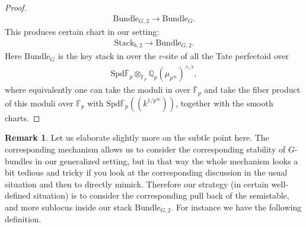 \documentclass[12pt]{book}
\theoremstyle{definition}
\newtheorem{remark}{Remark}
\begin{document}
\begin{proof}
\begin{align}
\mathrm{Bundle}_{G,2} \rightarrow \mathrm{Bundle}_{G}.
\end{align}
This produces certain chart in our setting:
\begin{align}
\mathrm{Stack}_{b,2}\rightarrow \mathrm{Bundle}_{G,2}.
\end{align}
Here $\mathrm{Bundle}_G$ is the key stack in \cite{FS} over the $v$-site of all the Tate perfectoid over
\begin{align}
\mathrm{Spd}\overline{\mathbb{F}}_p\otimes_{\mathbb{F}_p}\mathbb{Q}_p(\mu_{p^\infty})^{\wedge,\flat},
\end{align}
where equivalently one can take the moduli in \cite{FS} over $\overline{\mathbb{F}}_p$ and take the fiber product of this moduli over $\overline{\mathbb{F}}_p$ with $\mathrm{Spd}\overline{\mathbb{F}}_p((k^{1/p^\infty}))$, together with the smooth charts.
\end{proof}


\begin{remark}
Let us elaborate slightly more on the subtle point here. The corresponding mechanism allows us to consider the corresponding stability of $G$-bundles in our generalized setting, but in that way the whole mechanism looks a bit tedious and tricky if you look at the corresponding discussion in the usual situation and then to directly mimick. Therefore our strategy (in certain well-defined situation) is to consider the corresponding pull back of the semistable, and more sublocus inside our stack $\mathrm{Bundle}_{G,2}$. For instance we have the following definition.
\end{remark}
\end{document}
